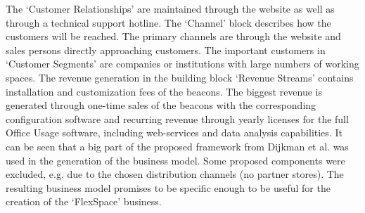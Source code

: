 		The `Customer Relationships' are maintained through the website as well as through a technical support hotline. The `Channel' block describes how the customers will be reached. The primary channels are through the website and sales persons directly approaching customers. The important customers in `Customer Segments' are companies or institutions with large numbers of working spaces. The revenue generation in the building block `Revenue Streams' contains installation and customization fees of the beacons. The biggest revenue is generated through one-time sales of the beacons with the corresponding configuration software and recurring revenue through yearly licenses for the full Office Usage software, including web-services and data analysis capabilities. It can be seen that a big part of the proposed framework from Dijkman et al. was used in the generation of the business model. Some proposed components were excluded, e.g. due to the chosen distribution channels (no partner stores). The resulting business model promises to be specific enough to be useful for the creation of the `FlexSpace' business.
	\vspace{-1em}

